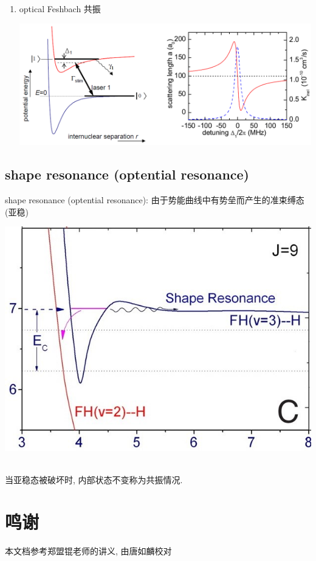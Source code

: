 \documentclass[10pt,a4paper,twocolumn]{article} %
\numberwithin{equation}{section} %
\begin{document}
\begin{enumerate}
\begin{centering}
	\end{centering}
	\item optical Feshbach 共振\\
	\begin{centering}
		\includegraphics[width=\linewidth]{ofr.jpg}
	\end{centering}
\end{enumerate}
\subsection{shape resonance (optential resonance)} %
\label{sub:shape_resonance}
shape resonance (optential resonance): 
由于势能曲线中有势垒而产生的准束缚态 (亚稳)\\
\begin{centering}
	\includegraphics[width=\linewidth]{shape-res.jpg}
\end{centering}\\
当亚稳态被破坏时, 内部状态不变称为共振情况.
\section*{鸣谢} 
本文档参考郑盟锟老师的讲义, 由唐如麟校对
\end{document}
